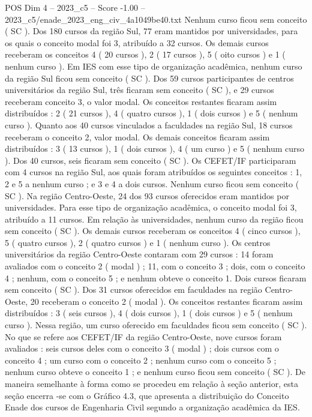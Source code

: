 \begin{textsample}{POS Dim 4 – 2023\_c5 – Score -1.00 – 2023\_c5/enade\_2023\_eng\_civ\_4a1049be40.txt}
Nenhum curso ficou sem conceito ( SC ).
Dos 180 cursos da região Sul, 77 eram mantidos por universidades, para os quais o conceito modal foi 3, atribuído a 32 cursos.
Os demais cursos receberam os conceitos 4 ( 20 cursos ), 2 ( 17 cursos ), 5 ( oito cursos ) e 1 ( nenhum curso ).
Em IES com esse tipo de organização acadêmica, nenhum curso da região Sul ficou sem conceito ( SC ).
Dos 59 cursos participantes de centros universitários da região Sul, três ficaram sem conceito ( SC ), e 29 cursos receberam conceito 3, o valor modal.
Os conceitos restantes ficaram assim distribuídos : 2 ( 21 cursos ), 4 ( quatro cursos ), 1 ( dois cursos ) e 5 ( nenhum curso ).
Quanto aos 40 cursos vinculados a faculdades na região Sul, 18 cursos receberam o conceito 2, valor modal.
Os demais conceitos ficaram assim distribuídos : 3 ( 13 cursos ), 1 ( dois cursos ), 4 ( um curso ) e 5 ( nenhum curso ).
Dos 40 cursos, seis ficaram sem conceito ( SC ).
Os CEFET/IF participaram com 4 cursos na região Sul, aos quais foram atribuídos os seguintes conceitos : 1, 2 e 5 a nenhum curso ; e 3 e 4 a dois cursos.
Nenhum curso ficou sem conceito ( SC ).
Na região Centro-Oeste, 24 dos 93 cursos oferecidos eram mantidos por universidades.
Para esse tipo de organização acadêmica, o conceito modal foi 3, atribuído a 11 cursos.
Em relação às universidades, nenhum curso da região ficou sem conceito ( SC ).
Os demais cursos receberam os conceitos 4 ( cinco cursos ), 5 ( quatro cursos ), 2 ( quatro cursos ) e 1 ( nenhum curso ).
Os centros universitários da região Centro-Oeste contaram com 29 cursos : 14 foram avaliados com o conceito 2 ( modal ) ; 11, com o conceito 3 ; dois, com o conceito 4 ; nenhum, com o conceito 5 ; e nenhum obteve o conceito 1.
Dois cursos ficaram sem conceito ( SC ).
Dos 31 cursos oferecidos em faculdades na região Centro-Oeste, 20 receberam o conceito 2 ( modal ).
Os conceitos restantes ficaram assim distribuídos : 3 ( seis cursos ), 4 ( dois cursos ), 1 ( dois cursos ) e 5 ( nenhum curso ).
Nessa região, um curso oferecido em faculdades ficou sem conceito ( SC ).
No que se refere aos CEFET/IF da região Centro-Oeste, nove cursos foram avaliados : seis cursos deles com o conceito 3 ( modal ) ; dois cursos com o conceito 4 ; um curso com o conceito 2 ; nenhum curso com o conceito 5 ; nenhum curso obteve o conceito 1 ; e nenhum curso ficou sem conceito ( SC ).
De maneira semelhante à forma como se procedeu em relação à seção anterior, esta seção encerra -se com o Gráfico 4.3, que apresenta a distribuição do Conceito Enade dos cursos de Engenharia Civil segundo a organização acadêmica da IES.

\end{textsample}
